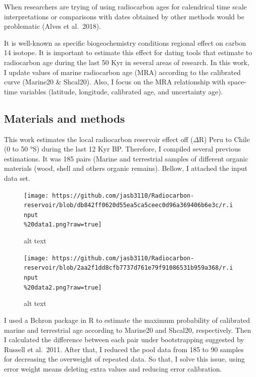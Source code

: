 \documentclass[
]{article}
\begin{document}
When researchers are trying of using radiocarbon ages for calendrical
time scale interpretations or comparisons with dates obtained by other
methods would be problematic (Alves et al.~2018).

It is well-known as specific biogeochemistry conditions regional effect
on carbon 14 isotope. It is important to estimate this effect for dating
tools that estimate to radiocarbon age during the last 50 Kyr in several
areas of research. In this work, I update values of marine radiocarbon
age (MRA) according to the calibrated curve (Marine20 \& Shcal20). Also,
I focus on the MRA relationship with space-time variables (latitude,
longitude, calibrated age, and uncertainty age).

\hypertarget{materials-and-methods}{%
\subsection{Materials and methods}\label{materials-and-methods}}

This work estimates the local radiocarbon reservoir effect off
(\(\Delta\)R) Peru to Chile (0 to 50 °S) during the last 12 Kyr BP.
Therefore, I compiled several previous estimations. It was 185 pairs
(Marine and terrestrial samples of different organic materials (wood,
shell and others organic remains). Bellow, I attached the input data
set.

\begin{figure}
\centering
\texttt{[image: https://github.com/jasb3110/Radiocarbon-reservoir/blob/db842ff0620d55ea5ca5ceec0d96a369406b6e3c/r.input\\\%20data1.png?raw=true]}
\caption{alt text}
\end{figure}

\begin{figure}
\centering
\texttt{[image: https://github.com/jasb3110/Radiocarbon-reservoir/blob/2aa2f1dd8cfb7737d761e79f91086531b959a368/r.input\\\%20data2.png?raw=true]}
\caption{alt text}
\end{figure}

I used a Bchron package in R to estimate the maximum probability of
calibrated marine and terrestrial age according to Marine20 and Shcal20,
respectively. Then I calculated the difference between each pair under
bootstrapping suggested by Russell et al.~2011. After that, I reduced
the pool data from 185 to 90 samples for decreasing the overweight of
repeated data. So that, I solve this issue, using error weight means
deleting extra values and reducing error calibration.
\end{document}
